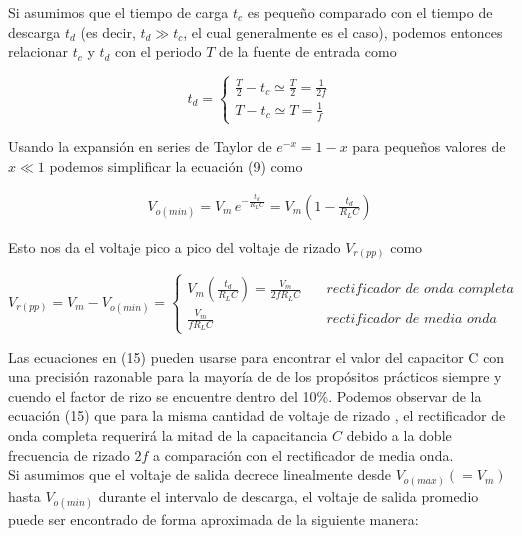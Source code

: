 \documentclass{article}
\begin{document}
\noindent Si asumimos que el tiempo de carga $t_c$ es pequeño comparado con el tiempo de descarga  $t_d$ (es decir, $t_d \gg t_c$, el cual generalmente es el caso), podemos entonces relacionar $t_c$ y $t_d$ con el periodo $T$ de la fuente de entrada como

\begin{equation}
	t_d =  
	\begin{cases}
		\frac{T}{2} - t_c \simeq \frac{T}{2} = \frac{1}{2f}\\
		T - t_c  \simeq T = \frac{1}{f}
	\end{cases}
\end{equation}

\noindent Usando la expansión en series de Taylor de $e^{-x} = 1-x$ para pequeños valores de $x \ll 1$ podemos simplificar la ecuación (9) como

\begin{align}
	V_{o(min)} = V_m \, e^{- \frac{t_d}{R_L C}} = V_m \left( 1 - \frac{t_d}{R_L C} \right)
\end{align}

\noindent Esto nos da el voltaje pico a pico del voltaje de rizado $V_{r(pp)}$ como

\begin{tcolorbox}[colback=red!5!white,colframe=red!75!black,arc=0mm,boxrule=0mm,width=(\linewidth+0.5cm)]
\begin{equation}
	V_{r(pp)} = V_m  - V_{o(min)} =   
	\begin{cases}
		V_m \left( \frac{t_d}{R_L C} \right)= \frac{V_m}{2fR_L C} \quad & rectificador \,\, de \,\, onda \,\, completa\\
		\frac{V_m}{fR_L C} \quad & rectificador \,\, de \,\, media \,\, onda
	\end{cases}
\end{equation}
\end{tcolorbox}

\noindent Las ecuaciones en (15) pueden usarse para encontrar el valor del capacitor C con una precisión razonable para la mayoría de de los propósitos prácticos siempre y cuendo el factor de rizo se encuentre dentro del 10\%. Podemos observar de la ecuación (15) que para la misma cantidad de voltaje de rizado , el rectificador de onda completa requerirá la mitad de la capacitancia $C$ debido a la doble frecuencia de rizado $2f$ a comparación con el rectificador de media onda. \\

\noindent Si asumimos que el voltaje de salida decrece linealmente desde $V_{o(max)}(=V_m)$ hasta $V_{o(min)}$ durante el intervalo de descarga, el voltaje de salida promedio puede ser encontrado de forma aproximada de la siguiente manera:
\end{document}
